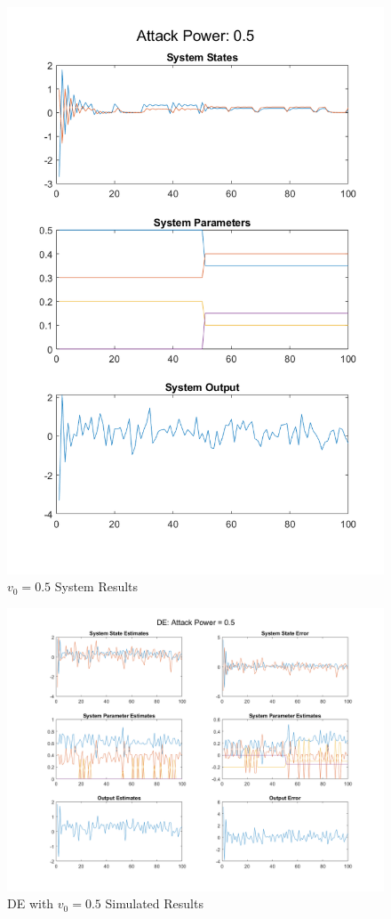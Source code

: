 \documentclass[]{article}
\begin{document}
\begin{figure}
	\centering
	\includegraphics[width=0.7\linewidth]{../../fig/SystemResponse_attack_0_5}
	\caption{$v_0 = 0.5$ System Results}
	\label{fig:systemresponseattack05}
\end{figure}

\begin{figure}
	\centering
	\includegraphics[width=\linewidth]{../../fig/DE_attack_0_5}
	\caption{DE with $v_0 = 0.5$ Simulated Results}
	\label{fig:deattack05}
\end{figure}
\end{document}
